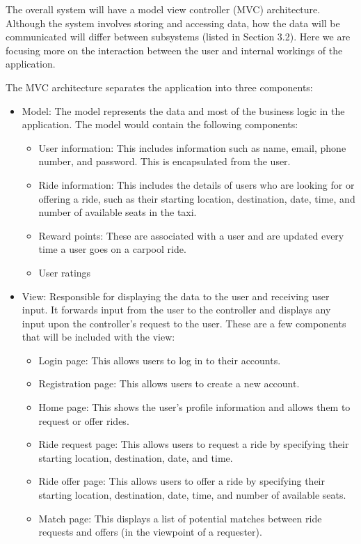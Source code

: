 \documentclass[]{article}
\begin{document}
The overall system will have a model view controller (MVC) architecture. Although the system involves storing and accessing data, how the data will be communicated will differ between subsystems (listed in Section 3.2). Here we are focusing more on the interaction between the user and internal workings of the application.

The MVC architecture separates the application into three components:
\begin{itemize}
    \item Model: The model represents the data and most of the business logic in the application. The model would contain the following components:
    \begin{itemize}
        \item User information: This includes information such as name, email, phone number, and password. This is encapsulated from the user.
        \item Ride information: This includes the details of users who are looking for or offering a ride, such as their starting location, destination, date, time, and number of available seats in the taxi.
        \item Reward points: These are associated with a user and are updated every time a user goes on a carpool ride.
        \item User ratings
    \end{itemize}
    \item View: Responsible for displaying the data to the user and receiving user input. It forwards input from the user to the controller and displays any input upon the controller's request to the user. These are a few components that will be included with the view:
    \begin{itemize}
        \item Login page: This allows users to log in to their accounts.
        \item Registration page: This allows users to create a new account.
        \item Home page: This shows the user's profile information and allows them to request or offer rides.
        \item Ride request page: This allows users to request a ride by specifying their starting location, destination, date, and time.
        \item Ride offer page: This allows users to offer a ride by specifying their starting location, destination, date, time, and number of available seats.
        \item Match page: This displays a list of potential matches between ride requests and offers (in the viewpoint of a requester).

\end{itemize}
\end{itemize}
\end{document}
